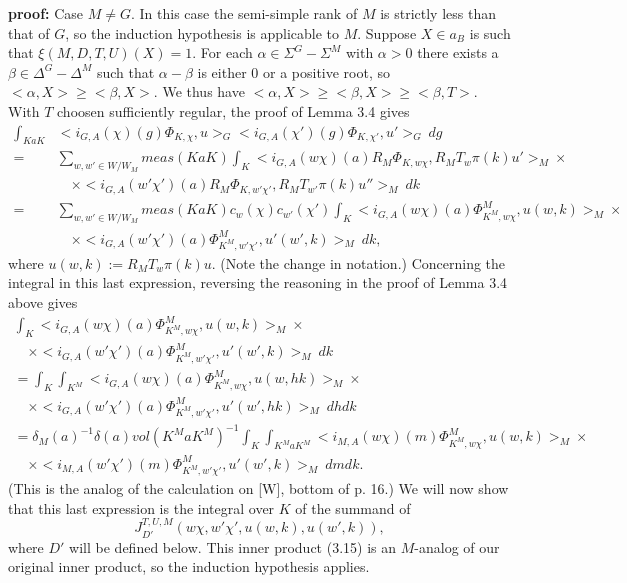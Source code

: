 \documentclass[12pt]{article}
\newenvironment{pf}[1][proof:]{\par\medskip\noindent\textbf{#1} }{\par\medskip}
\begin{document}
\begin{pf}
Case $M\neq G$. In this case the semi-simple rank of $M$ is strictly less than that of $G$, so the induction hypothesis is applicable to $M$. Suppose $X\in a_B$ is such that $\xi(M,D,T,U)(X)=1$. For each $\alpha\in\Sigma^G-\Sigma^M$ with $\alpha>0$ there exists a $\beta\in\Delta^G-\Delta^M$ such that $\alpha-\beta$ is either 0 or a positive root, so $<\alpha,X>\geq<\beta,X>$. We thus have $<\alpha,X>\geq<\beta,X>\geq<\beta,T>$. With $T$ choosen sufficiently regular, the proof of Lemma 3.4 gives
\begin{equation}\tag{3.13}
\begin{array}{rl}
\int_{KaK}&<i_{G,A}(\chi)(g)\Phi_{K,\chi},u>_G<i_{G,A}(\chi')(g)\Phi_{K,\chi'},u'>_G\ dg\\
=&\sum_{w,w'\in W/W_M}meas(KaK)\int_K<i_{G,A}(w\chi)(a)R_M\Phi_{K,w\chi},R_MT_w\pi(k)u'>_M\times\\
&\quad\times<i_{G,A}(w'\chi')(a)R_M\Phi_{K,w'\chi'},R_MT_{w'}\pi(k)u''>_M\ dk\\
=&\sum_{w,w'\in W/W_M}meas(KaK)c_w(\chi)c_{w'}(\chi')\int_K<i_{G,A}(w\chi)(a)\Phi^M_{K^M,w\chi},u(w,k)>_M\times\\
&\quad\times<i_{G,A}(w'\chi')(a)\Phi^M_{K^M,w'\chi'},u'(w',k)>_M\ dk,
\end{array}
\end{equation}
where $u(w,k):=R_MT_w\pi(k)u$. (Note the change in notation.) Concerning the integral in this last expression, reversing the reasoning in the proof of Lemma 3.4 above gives
\begin{equation}\tag{3.14}
\begin{array}{l}
\int_K<i_{G,A}(w\chi)(a)\Phi^M_{K^M,w\chi},u(w,k)>_M\times\\
\quad\times<i_{G,A}(w'\chi')(a)\Phi^M_{K^M,w'\chi'},u'(w',k)>_M\ dk\\
=\int_K\int_{K^M}<i_{G,A}(w\chi)(a)\Phi^M_{K^M,w\chi},u(w,hk)>_M\times\\
\quad\times<i_{G,A}(w'\chi')(a)\Phi^M_{K^M,w'\chi'},u'(w',hk)>_M\ dhdk\\
=\delta_M(a)^{-1}\delta(a)vol(K^MaK^M)^{-1}\int_K\int_{K^MaK^M}<i_{M,A}(w\chi)(m)\Phi^M_{K^M,w\chi},u(w,k)>_M\times\\
\quad\times<i_{M,A}(w'\chi')(m)\Phi^M_{K^M,w'\chi'},u'(w',k)>_M\ dmdk.
\end{array}
\end{equation}
(This is the analog of the calculation on [W], bottom of p. 16.) We will now show that this last expression is the integral over $K$ of the summand of
\begin{equation}\tag{3.15}
J^{T,U,M}_{D'}(w\chi,w'\chi',u(w,k),u(w',k)),
\end{equation}
where $D'$ will be defined below. This inner product (3.15) is an $M$-analog of our original inner product, so the induction hypothesis applies.


\end{pf}
\end{document}
